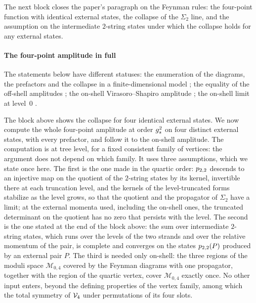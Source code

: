 

The next block closes the paper's paragraph on the Feynman rules: the four-point function with identical external states, the collapse of the $\Sigma_2$ line, and the assumption on the intermediate $2$-string states under which the collapse holds for any external states.



\paragraph{The four-point amplitude in full}
\label{sec:order:amplitude}

The statements below have different statuses: the enumeration of the diagrams, the prefactors and the collapse in a finite-dimensional model ; the equality of the off-shell amplitudes ; the on-shell Virasoro--Shapiro amplitude ; the on-shell limit at level~$0$ .

The block above shows the collapse for four identical external states.
We now compute the whole four-point amplitude at order $g_s^2$ on four distinct external states, with every prefactor, and follow it to the on-shell amplitude.
The computation is at tree level, for a fixed consistent family of vertices: the argument does not depend on which family.
It uses three assumptions, which we state once here.
The first is the one made in the quartic order: $p_{2,2}$ descends to an injective map on the quotient of the $2$-string states by its kernel, invertible there at each truncation level, and the kernels of the level-truncated forms stabilize as the level grows, so that the quotient and the propagator of $\Sigma_2$ have a limit; at the external momenta used, including the on-shell ones, the truncated determinant on the quotient has no zero that persists with the level.
The second is the one stated at the end of the block above: the sum over intermediate $2$-string states, which runs over the levels of the two strands and over the relative momentum of the pair, is complete and converges on the states $p_{2,2}(P)$ produced by an external pair $P$.
The third is needed only on-shell: the three regions of the moduli space $\mathcal M_{0, 4}$ covered by the Feynman diagrams with one propagator, together with the region of the quartic vertex, cover $\mathcal M_{0, 4}$ exactly once.
No other input enters, beyond the defining properties of the vertex family, among which the total symmetry of $\mathcal{V}_{4}$ under permutations of its four slots.

